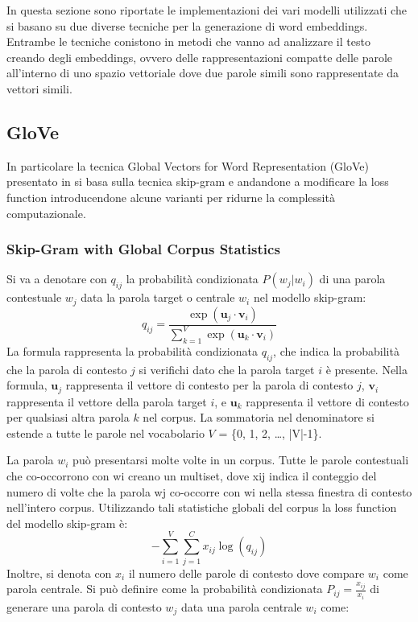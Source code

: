 In questa sezione sono riportate le implementazioni dei vari modelli utilizzati che si basano su due diverse tecniche per la generazione di word embeddings. Entrambe le tecniche conistono in metodi che vanno ad analizzare il testo creando degli embeddings, ovvero delle rappresentazioni compatte delle parole all'interno di uno spazio vettoriale dove due parole simili sono rappresentate da vettori simili. 

\subsection{GloVe}
In particolare la tecnica Global Vectors for Word Representation (GloVe) presentato in \cite{pennington2014glove} si basa sulla tecnica skip-gram e andandone a modificare la loss function introducendone alcune varianti per ridurne la complessità computazionale.
 \subsubsection{Skip-Gram with Global Corpus Statistics}
Si va a denotare con $q_{ij}$ la probabilità condizionata $P({w_{j}} | {w_{i}})$ di una parola contestuale $w_{j}$ data la parola target o centrale $w_{i}$ nel modello skip-gram:
\[q_{ij} = \frac{{\exp(\mathbf{u}_j \cdot \mathbf{v}_i)}}{{\sum_{k=1}^{V} \exp(\mathbf{u}_k \cdot \mathbf{v}_i)}}\]
La formula rappresenta la probabilità condizionata $q_{ij}$, che indica la probabilità che la parola di contesto $j$ si verifichi dato che la parola target $i$ è presente. Nella formula, $\mathbf{u}_j$ rappresenta il vettore di contesto per la parola di contesto $j$, $\mathbf{v}_i$ rappresenta il vettore della parola target $i$, e $\mathbf{u}_k$ rappresenta il vettore di contesto per qualsiasi altra parola $k$ nel corpus. La sommatoria nel denominatore si estende a tutte le parole nel vocabolario $V$ = \{0, 1, 2, \ldots, |V|-1\}.

La parola $w_{i}$ può presentarsi molte volte in un corpus. Tutte le parole contestuali che co-occorrono con wi creano un multiset, dove xij indica il conteggio del numero di volte che la parola wj co-occorre con wi nella stessa finestra di contesto nell'intero corpus. Utilizzando tali statistiche globali del corpus la loss function del modello skip-gram è:
\[-\sum_{i=1}^{V}\sum_{j=1}^{C} x_{ij} \log(q_{ij})\]
Inoltre, si denota con $x_{i}$ il numero delle parole di contesto dove compare $w_{i}$ come parola centrale. Si può definire come la probabilità condizionata $P_{ij} = \frac{x_{ij}}{x_i}$
di generare una parola di contesto $w_{j}$ data una parola centrale $w_{i}$ come:

